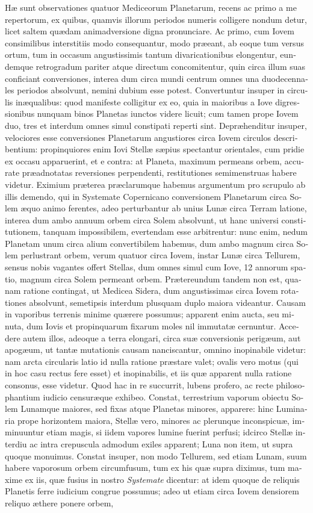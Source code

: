 \documentclass[11pt,twoside,openany]{book}
\begin{document}
\begin{otherlanguage}{latin}
Hæ sunt observationes quatuor Mediceorum Planetarum, recens ac primo a me repertorum, ex quibus, quamvis illorum periodos numeris colligere nondum detur, licet saltem quædam animadversione digna pronunciare. Ac primo, cum Iovem consimilibus interstitiis modo consequantur, modo præeant, ab eoque tum versus ortum, tum in occasum angustissimis tantum divaricationibus elongentur, eundemque retrogradum pariter atque directum concomitentur, quin circa illum suas conficiant conversiones, interea dum circa mundi centrum omnes una duodecennales periodos absolvunt, nemini dubium esse potest. Convertuntur insuper in circulis inæqualibus: quod manifeste colligitur ex eo, quia in maioribus a Iove digressionibus nunquam binos Planetas iunctos videre licuit; cum tamen prope Iovem duo, tres et interdum omnes simul constipati reperti sint. Depræhenditur insuper, velociores esse conversiones Planetarum angustiores circa Iovem circulos describentium: propinquiores enim Iovi Stellæ sæpius spectantur orientales, cum pridie ex occasu apparuerint, et e contra: at Planeta, maximum permeans orbem, accurate præadnotatas reversiones perpendenti, restitutiones semimenstruas habere videtur. Eximium præterea præclarumque habemus argumentum pro scrupulo ab illis demendo, qui in Systemate Copernicano conversionem Planetarum circa Solem æquo animo ferentes, adeo perturbantur ab unius Lunæ circa Terram latione, interea dum ambo annuum orbem circa Solem absolvunt, ut hanc universi constitutionem, tanquam impossibilem, evertendam esse arbitrentur: nunc enim, nedum Planetam unum circa alium convertibilem habemus, dum ambo magnum circa Solem perlustrant orbem, verum quatuor circa Iovem, instar Lunæ circa Tellurem, sensus nobis vagantes offert Stellas, dum omnes simul cum Iove, 12 annorum spatio, magnum circa Solem permeant orbem. Prætereundum tandem non est, quanam ratione contingat, ut Medicea Sidera, dum angustissimas circa Iovem rotationes absolvunt, semetipsis interdum plusquam duplo maiora videantur. Causam in vaporibus terrenis minime quærere possumus; apparent enim aucta, seu minuta, dum Iovis et propinquarum fixarum moles nil immutatæ cernuntur. Accedere autem illos, adeoque a terra elongari, circa suæ conversionis perigæum, aut apogæum, ut tantæ mutationis causam nanciscantur, omnino inopinabile videtur: nam arcta circularis latio id nulla ratione præstare valet; ovalis vero motus (qui in hoc casu rectus fere esset) et inopinabilis, et iis quæ apparent nulla ratione consonus, esse videtur. Quod hac in re succurrit, lubens profero, ac recte philosophantium iudicio censuræque exhibeo. Constat, terrestrium vaporum obiectu Solem Lunamque maiores, sed fixas atque Planetas minores, apparere: hinc Luminaria prope horizontem maiora, Stellæ vero, minores ac plerunque inconspicuæ, imminuuntur etiam magis, si iidem vapores lumine fuerint perfusi; idcirco Stellæ interdiu ac intra crepuscula admodum exiles apparent; Luna non item, ut supra quoque monuimus. Constat insuper, non modo Tellurem, sed etiam Lunam, suum habere vaporosum orbem circumfusum, tum ex his quæ supra diximus, tum maxime ex iis, quæ fusius in nostro \textit{Systemate} dicentur: at idem quoque de reliquis Planetis ferre iudicium congrue possumus; adeo ut etiam circa Iovem densiorem reliquo æthere ponere orbem, 
\end{otherlanguage}
\end{document}
